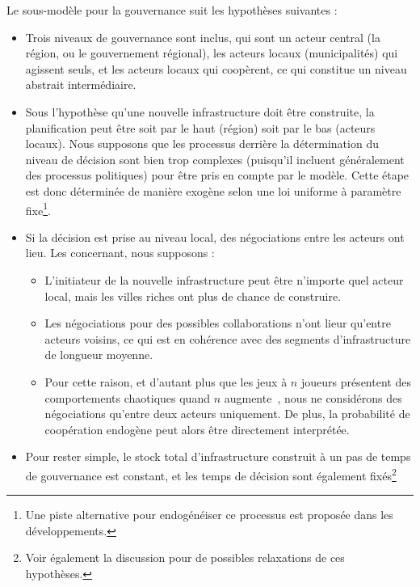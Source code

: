 {\begin{itemize}
\end{itemize}
}{
Le sous-modèle pour la gouvernance suit les hypothèses suivantes :
\begin{itemize}
	\item Trois niveaux de gouvernance sont inclus, qui sont un acteur central (la région, ou le gouvernement régional), les acteurs locaux (municipalités) qui agissent seuls, et les acteurs locaux qui coopèrent, ce qui constitue un niveau abstrait intermédiaire.
	\item Sous l'hypothèse qu'une nouvelle infrastructure doit être construite, la planification peut être soit par le haut (région) soit par le bas (acteurs locaux). Nous supposons que les processus derrière la détermination du niveau de décision sont bien trop complexes (puisqu'il incluent généralement des processus politiques) pour être pris en compte par le modèle. Cette étape est donc déterminée de manière exogène selon une loi uniforme à paramètre fixe\footnote{Une piste alternative pour endogénéiser ce processus est proposée dans les développements.}.
	\item Si la décision est prise au niveau local, des négociations entre les acteurs ont lieu. Les concernant, nous supposons :
	\begin{itemize}
		\item L'initiateur de la nouvelle infrastructure peut être n'importe quel acteur local, mais les villes riches ont plus de chance de construire.
		\item Les négociations pour des possibles collaborations n'ont lieur qu'entre acteurs voisins, ce qui est en cohérence avec des segments d'infrastructure de longueur moyenne.
		\item Pour cette raison, et d'autant plus que les jeux à $n$ joueurs présentent des comportements chaotiques quand $n$ augmente~\cite{2016arXiv161208111S}, nous ne considérons des négociations qu'entre deux acteurs uniquement. De plus, la probabilité de coopération endogène peut alors être directement interprétée.
	\end{itemize}
	\item Pour rester simple, le stock total d'infrastructure construit à un pas de temps de gouvernance est constant, et les temps de décision sont également fixés\footnote{Voir également la discussion pour de possibles relaxations de ces hypothèses.}
\end{itemize}
}





